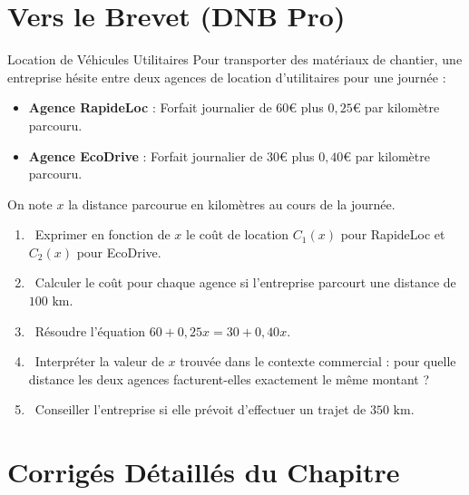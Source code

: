 \section{Vers le Brevet (DNB Pro)}

\begin{sujetdnb}{Location de Véhicules Utilitaires}
Pour transporter des matériaux de chantier, une entreprise hésite entre deux agences de location d'utilitaires pour une journée :
\begin{itemize}
    \item \textbf{Agence RapideLoc} : Forfait journalier de $60\euro$ plus $0{,}25\euro$ par kilomètre parcouru.
    \item \textbf{Agence EcoDrive} : Forfait journalier de $30\euro$ plus $0{,}40\euro$ par kilomètre parcouru.
\end{itemize}
On note $x$ la distance parcourue en kilomètres au cours de la journée.

\begin{enumerate}
    \item \capSApproprier\ Exprimer en fonction de $x$ le coût de location $C_1(x)$ pour RapideLoc et $C_2(x)$ pour EcoDrive.
    \item \capRealiser\ Calculer le coût pour chaque agence si l'entreprise parcourt une distance de $100\text{ km}$.
    \item \capAnalyser\ Résoudre l'équation $60 + 0{,}25x = 30 + 0{,}40x$.
    \item \capValider\ Interpréter la valeur de $x$ trouvée dans le contexte commercial : pour quelle distance les deux agences facturent-elles exactement le même montant ?
    \item \capCommuniquer\ Conseiller l'entreprise si elle prévoit d'effectuer un trajet de $350\text{ km}$.
\end{enumerate}
\lignesreponse[7]
\end{sujetdnb}

\section{Corrigés Détaillés du Chapitre}

